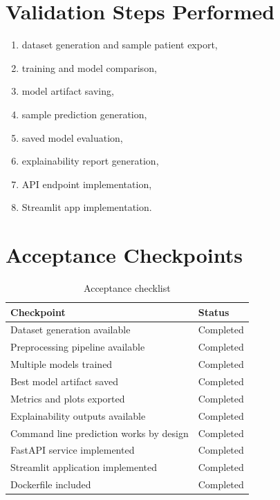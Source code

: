 \documentclass[12pt,a4paper,openany]{report}
\begin{document}
    \section{Validation Steps Performed}
    \begin{enumerate}[leftmargin=1.4cm]
    \item dataset generation and sample patient export,
    \item training and model comparison,
    \item model artifact saving,
    \item sample prediction generation,
    \item saved model evaluation,
    \item explainability report generation,
    \item API endpoint implementation,
    \item Streamlit app implementation.
    \end{enumerate}

    \section{Acceptance Checkpoints}
    \begin{table}[H]
    \centering
    \caption{Acceptance checklist}
    \begin{tabularx}{\textwidth}{X >{\raggedright\arraybackslash}p{2.2cm}}
    \toprule
    \textbf{Checkpoint} & \textbf{Status} \\
    \midrule
    Dataset generation available & Completed \\
    Preprocessing pipeline available & Completed \\
    Multiple models trained & Completed \\
    Best model artifact saved & Completed \\
    Metrics and plots exported & Completed \\
    Explainability outputs available & Completed \\
    Command line prediction works by design & Completed \\
    FastAPI service implemented & Completed \\
    Streamlit application implemented & Completed \\
    Dockerfile included & Completed \\
    \bottomrule
    \end{tabularx}
    \end{table}
\end{document}
